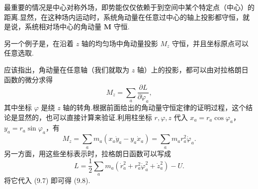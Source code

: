 最重要的情况是中心对称外场，即势能仅仅依赖于到空间中某个特定点（中心）的距离.显然，在这种场内运动时，系统角动量在任意过中心的轴上投影都守恒，就是说，系统相对场中心的角动量 $\boldsymbol{M}$ 守恒.

另一个例子是，在沿着 $z$ 轴的均匀场中角动量投影 $M_z$ 守恒，并且坐标原点可以任意选取.

应该指出，角动量在任意轴（我们就取为 $z$ 轴）上的投影，都可以由对拉格朗日函数的微分求得
\begin{equation}
  M_z=\sum_a\frac{\partial L}{\partial\dot{\varphi}_a},
\end{equation}
其中坐标 $\varphi$ 是绕 $z$ 轴的转角.根据前面给出的角动量守恒定律的证明过程，这个结论是显然的，也可以直接计算来验证.利用柱坐标 $r,\varphi,z$ 代入 $x_a=r_a\cos\varphi_a$，$y_a=r_a\sin\varphi_a$，有
\begin{equation}
  M_z=\sum_a m_a\left(x_a\dot{y}_a-y_a\dot{x}_a\right)
  =\sum_a m_a r_a^2\dot{\varphi}_a.
\end{equation}
另一方面，用这些坐标表示时，拉格朗日函数可以写成
\begin{equation*}
  L=\frac{1}{2}\sum_a m_a\left(\dot{r}_a^2+r_a^2\dot{\varphi}_a^2
  +\dot{z}_a^2\right)-U.
\end{equation*}
将它代入 (9.7) 即可得 (9.8).

